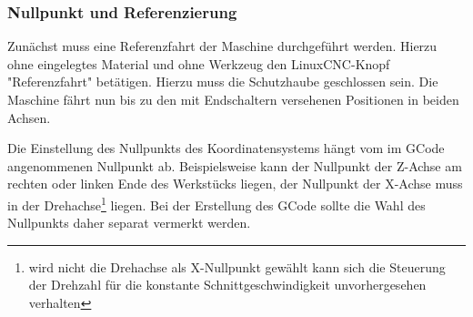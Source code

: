 \documentclass{\basedir/fablab-document}
\begin{document}
\subsubsection{Nullpunkt und Referenzierung}

Zunächst muss eine Referenzfahrt der Maschine durchgeführt werden. Hierzu ohne eingelegtes Material und ohne Werkzeug den LinuxCNC-Knopf "Referenzfahrt" betätigen. Hierzu muss die Schutzhaube geschlossen sein. Die Maschine fährt nun bis zu den mit Endschaltern versehenen Positionen in beiden Achsen.

Die Einstellung des Nullpunkts des Koordinatensystems hängt vom im GCode angenommenen Nullpunkt ab. Beispielsweise kann der Nullpunkt der Z-Achse am rechten oder linken Ende des Werkstücks liegen, der Nullpunkt der X-Achse muss in der Drehachse\footnote{wird nicht die Drehachse als X-Nullpunkt gewählt kann sich die Steuerung der Drehzahl für die konstante Schnittgeschwindigkeit unvorhergesehen verhalten} liegen. Bei der Erstellung des GCode sollte die Wahl des Nullpunkts daher separat vermerkt werden.
\end{document}
